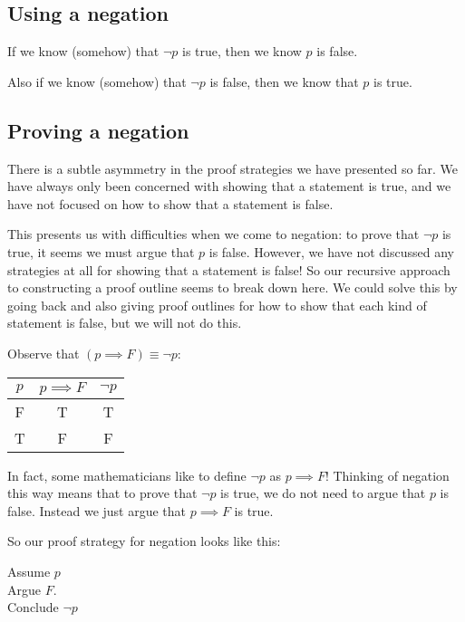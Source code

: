\subsection{Using a negation}

If we know (somehow) that $\neg p$ is true, then we know $p$ is false.

Also if we know (somehow) that $\neg p$ is false, then we know that $p$ is true.

\subsection{Proving a negation}

There is a subtle asymmetry in the proof strategies we have presented so far.  We have always only been concerned with showing that a statement is true, and we have not focused on how to show that a statement is false.

This presents us with difficulties when we come to negation:  to prove that $\neg p$ is true, it seems we must argue that $p$ is false.  However, we have not discussed any strategies at all for showing that a statement is false!  So our recursive approach to constructing a proof outline seems to break down here.  We could solve this by going back and also giving proof outlines for how to show that each kind of statement is false, but we will not do this.

Observe that $(p \implies F) \equiv \neg p$:

\begin{table}[h]
	\centering
	\begin{tabular}{c|c|c}
		$p$ & $p \implies F$ & $\neg p$ 	\\ \hline
		F & T & T 	\\ \hline
		T & F & F
	\end{tabular}
\end{table}

In fact, some mathematicians like to define $\neg p$ as $p \implies F$!    Thinking of negation this way means that to prove that $\neg p$ is true, we do not need to argue that $p$ is false.  Instead we just argue that $p \implies F$ is true.

So our proof strategy for negation looks like this:

\begin{fitch*}
	\textrm{Assume $p$}\\
	\fa \textrm{Argue $F$.}\\
	\textrm{Conclude $\neg p$}
	\end{fitch*}

